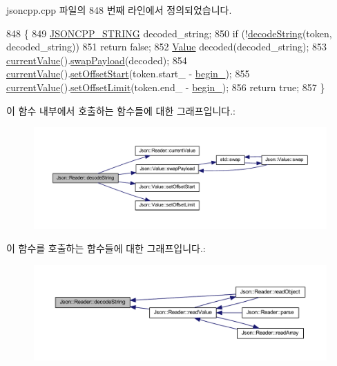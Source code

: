 jsoncpp.\+cpp 파일의 848 번째 라인에서 정의되었습니다.


\begin{DoxyCode}
848                                       \{
849   \hyperlink{json-forwards_8h_a1e723f95759de062585bc4a8fd3fa4be}{JSONCPP\_STRING} decoded\_string;
850   \textcolor{keywordflow}{if} (!\hyperlink{class_json_1_1_reader_aaf736937912f5c9b8d221e57f209e3e0}{decodeString}(token, decoded\_string))
851     \textcolor{keywordflow}{return} \textcolor{keyword}{false};
852   \hyperlink{class_json_1_1_value}{Value} decoded(decoded\_string);
853   \hyperlink{class_json_1_1_reader_a85597f763fb0148a17359b6dfc6f7326}{currentValue}().\hyperlink{class_json_1_1_value_a5263476047f20e2fc6de470e4de34fe5}{swapPayload}(decoded);
854   \hyperlink{class_json_1_1_reader_a85597f763fb0148a17359b6dfc6f7326}{currentValue}().\hyperlink{class_json_1_1_value_a92e32ea0f4f8a15853a3cf0beac9feb9}{setOffsetStart}(token.start\_ - \hyperlink{class_json_1_1_reader_a327166839022ea91f0a8290960a8af76}{begin\_});
855   \hyperlink{class_json_1_1_reader_a85597f763fb0148a17359b6dfc6f7326}{currentValue}().\hyperlink{class_json_1_1_value_a5e4f5853fec138150c5df6004a8c2bcf}{setOffsetLimit}(token.end\_ - \hyperlink{class_json_1_1_reader_a327166839022ea91f0a8290960a8af76}{begin\_});
856   \textcolor{keywordflow}{return} \textcolor{keyword}{true};
857 \}
\end{DoxyCode}
이 함수 내부에서 호출하는 함수들에 대한 그래프입니다.\+:\nopagebreak
\begin{figure}[H]
\begin{center}
\leavevmode
\includegraphics[width=350pt]{class_json_1_1_reader_aaf736937912f5c9b8d221e57f209e3e0_cgraph}
\end{center}
\end{figure}
이 함수를 호출하는 함수들에 대한 그래프입니다.\+:\nopagebreak
\begin{figure}[H]
\begin{center}
\leavevmode
\includegraphics[width=350pt]{class_json_1_1_reader_aaf736937912f5c9b8d221e57f209e3e0_icgraph}
\end{center}
\end{figure}
\mbox{\label{class_json_1_1_reader_a8911a3225ee94d86d83edc2f8c1befe0}} 
